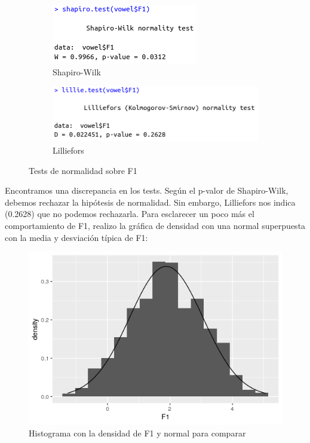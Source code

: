 \begin{figure}[H]
	\centering
	\begin{subfigure}{.5\textwidth}
		\centering
		\includegraphics[width=.7\linewidth]{sw-F1.png}
		\caption{Shapiro-Wilk}
		\label{fig:sw-F1}
	\end{subfigure}%
	\begin{subfigure}{.5\textwidth}
		\centering
		\includegraphics[width=.75\linewidth]{l-F1.png}
		\caption{Lilliefors}
		\label{fig:l-F1}
	\end{subfigure}
	\caption{Tests de normalidad sobre F1}
	\label{fig:normF1}
\end{figure}

Encontramos una discrepancia en los tests. Según el p-valor de Shapiro-Wilk, debemos rechazar la hipótesis de normalidad. Sin embargo, Lilliefors nos indica (0.2628) que no podemos rechazarla. Para esclarecer un poco más el comportamiento de F1, realizo la gráfica de densidad con una normal superpuesta con la media y desviación típica de F1:

 \begin{figure}[H] %
 	\centering
 	\includegraphics[scale=0.6]{density-F1.png}  %
 	\caption{Histograma con la densidad de F1 y normal para comparar} 
 	\label{fig:dense-F1}
 \end{figure}

